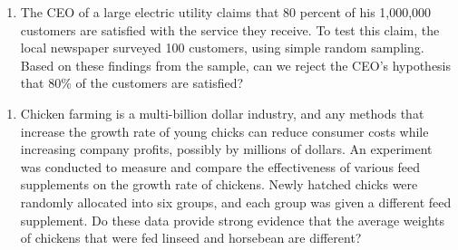 \documentclass[]{article}
\providecommand{\tightlist}{%
  \setlength{\itemsep}{0pt}\setlength{\parskip}{0pt}}
\begin{document}
\begin{enumerate}
\def\labelenumi{\arabic{enumi}.}
\setcounter{enumi}{8}
\tightlist
\item
  The CEO of a large electric utility claims that 80 percent of his
  1,000,000 customers are satisfied with the service they receive. To
  test this claim, the local newspaper surveyed 100 customers, using
  simple random sampling. Based on these findings from the sample, can
  we reject the CEO's hypothesis that 80\% of the customers are
  satisfied?
\end{enumerate}

\begin{enumerate}
\def\labelenumi{\arabic{enumi}.}
\setcounter{enumi}{9}
\tightlist
\item
  Chicken farming is a multi-billion dollar industry, and any methods
  that increase the growth rate of young chicks can reduce consumer
  costs while increasing company profits, possibly by millions of
  dollars. An experiment was conducted to measure and compare the
  effectiveness of various feed supplements on the growth rate of
  chickens. Newly hatched chicks were randomly allocated into six
  groups, and each group was given a different feed supplement. Do these
  data provide strong evidence that the average weights of chickens that
  were fed linseed and horsebean are different?
\end{enumerate}
\end{document}
